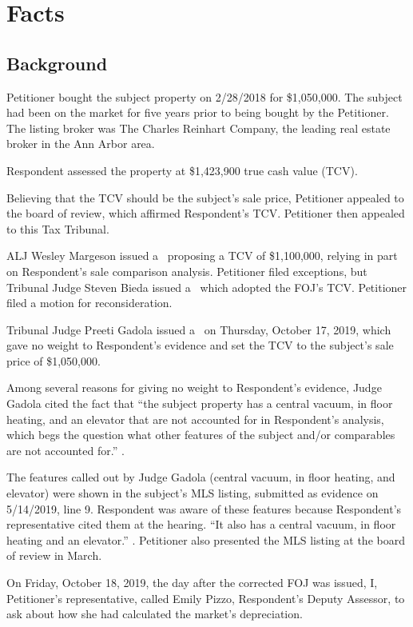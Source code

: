 \documentclass[12pt,\documentclassflag]{michiganCourtOfAppealsBrief}
\begin{document}
  
\section{Facts}
\subsection{Background}
Petitioner bought the subject property on 2/28/2018 for \$1,050,000.
The subject had been on the market for five years prior to being bought by the Petitioner. The listing broker was The Charles Reinhart Company, the leading real estate broker in the Ann Arbor area. 

Respondent assessed the property at \$1,423,900 true cash value (TCV).

Believing that the TCV should be the subject's sale price, Petitioner appealed to the board of review, which affirmed Respondent's TCV. Petitioner then appealed to this Tax Tribunal.

ALJ Wesley Margeson issued a \cite{POJ}\ proposing a TCV of \$1,100,000, relying in part on Respondent's sale comparison analysis.
Petitioner filed exceptions, but Tribunal Judge Steven Bieda issued a \cite{FOJ1}\ which adopted the FOJ's TCV.
Petitioner filed a motion for reconsideration.

Tribunal Judge Preeti Gadola issued a \cite{FOJ2}\ on Thursday, October 17, 2019, which gave no weight to Respondent's evidence and set the TCV to the subject's sale price of \$1,050,000.

Among several reasons for giving no weight to Respondent's evidence, Judge Gadola cited the fact that ``the subject property has a central vacuum, in floor heating, and an elevator that are not accounted for in Respondent's analysis, which begs the question what other features of the subject and/or comparables are not accounted for.'' .

The features called out by Judge Gadola (central vacuum, in floor heating, and elevator) were shown in the subject's MLS listing, submitted as evidence on 5/14/2019, line 9. Respondent was aware of these features because Respondent's representative cited them at the hearing. ``It also has a central vacuum, in floor heating and an elevator.'' . Petitioner also presented the MLS listing at the board of review in March.

On Friday, October 18, 2019, the day after the corrected FOJ was issued, I, Petitioner's representative, called Emily Pizzo, Respondent's Deputy Assessor, to ask about how she had calculated the market's depreciation.
\end{document}
